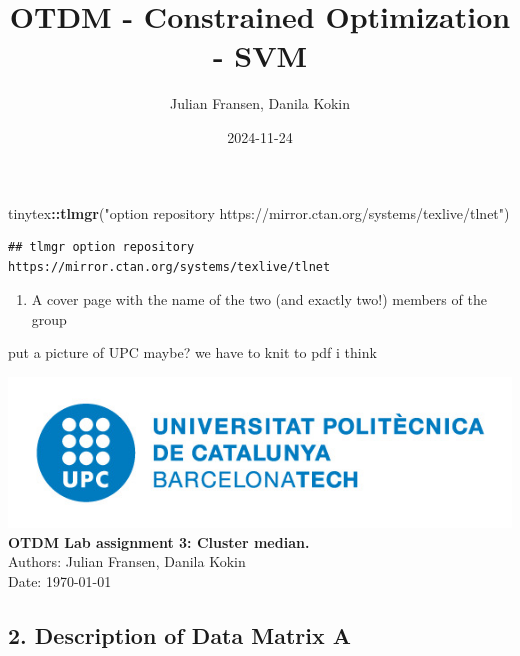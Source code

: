 \documentclass[
]{article}
\title{OTDM - Constrained Optimization - SVM}
\author{Julian Fransen, Danila Kokin}
\date{2024-11-24}
\newenvironment{Shaded}{\begin{snugshade}}{\end{snugshade}}
\newcommand{\FunctionTok}[1]{\textcolor[rgb]{0.13,0.29,0.53}{\textbf{#1}}}
\newcommand{\NormalTok}[1]{#1}
\newcommand{\SpecialCharTok}[1]{\textcolor[rgb]{0.81,0.36,0.00}{\textbf{#1}}}
\newcommand{\StringTok}[1]{\textcolor[rgb]{0.31,0.60,0.02}{#1}}
\providecommand{\tightlist}{%
  \setlength{\itemsep}{0pt}\setlength{\parskip}{0pt}}
\begin{document}
\maketitle

{
\setcounter{tocdepth}{3}
\tableofcontents
}
\begin{Shaded}
\begin{Highlighting}[]
\NormalTok{tinytex}\SpecialCharTok{::}\FunctionTok{tlmgr}\NormalTok{(}\StringTok{"option repository https://mirror.ctan.org/systems/texlive/tlnet"}\NormalTok{)}
\end{Highlighting}
\end{Shaded}

\begin{verbatim}
## tlmgr option repository https://mirror.ctan.org/systems/texlive/tlnet
\end{verbatim}

\begin{enumerate}
\def\labelenumi{\arabic{enumi}.}
\tightlist
\item
  A cover page with the name of the two (and exactly two!) members of
  the group
\end{enumerate}

put a picture of UPC maybe? we have to knit to pdf i think

\begin{titlepage}
    \centering
    \vspace*{4cm} %
    \includegraphics[width=\textwidth]{./UPC.jpg}
    \vfill
    {\Huge \textbf{OTDM Lab assignment 3: Cluster median.}} \\[1.5cm]
    {\Large Authors: Julian Fransen, Danila Kokin} \\[0.5cm]
    {\Large Date: \today}
    \vfill
\end{titlepage}

\subsection{2. Description of Data Matrix
A}\label{description-of-data-matrix-a}
\end{document}
